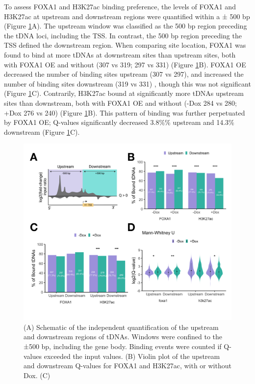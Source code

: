 \documentclass[
  12pt,
]{article}
\begin{document}
To assess FOXA1 and H3K27ac binding preference, the levels of FOXA1 and H3K27ac at upstream and downstream regions were quantified within a ± 500 bp (Figure \ref{fig:results-4}A).
The upstream window was classified as the 500 bp region preceding the tDNA loci, including the TSS.
In contrast, the 500 bp region preceding the TSS defined the downstream region.
When comparing site location, FOXA1 was found to bind at more tDNAs at downstream sites than upstream sites, both with FOXA1 OE and without (307 vs 319; 297 vs 331) (Figure \ref{fig:results-4}B).
FOXA1 OE decreased the number of binding sites upstream (307 vs 297), and increased the number of binding sites downstream (319 vs 331) , though this was not significant (Figure \ref{fig:results-4}C).
Contrarily, H3K27ac bound at significantly more tDNAs upstream sites than downstream, both with FOXA1 OE and without (-Dox 284 vs 280; +Dox 276 vs 240) (Figure \ref{fig:results-4}B).
This pattern of binding was further perpetuated by FOXA1 OE; Q-values significantly decreased 3.8\%\% upstream and 14.3\% downstream (Figure \ref{fig:results-4}C).

\begin{figure}[p]
\includegraphics[width=1\linewidth]{../images/results-04} \caption{(A) Schematic of the independent quantification of the upstream and downstream regions of tDNAs. Windows were confined to the ±500 bp, including the gene body. Binding events were counted if Q-values exceeded the input values. (B) Violin plot of the upstream and downstream Q-values for FOXA1 and H3K27ac, with or without Dox. (C)}\label{fig:results-4}
\end{figure}
\end{document}
